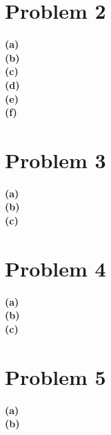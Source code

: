 \documentclass[fleqn]{article}
\begin{document}
\begin{adjustwidth}{-2cm}{-2cm}
\section{Problem 2}
\textbf{(a)}\\
\textbf{(b)}\\
\textbf{(c)}\\
\textbf{(d)}\\
\textbf{(e)}\\
\textbf{(f)}\\

\section{Problem 3}
\textbf{(a)}\\
\textbf{(b)}\\
\textbf{(c)}\\

\section{Problem 4}
\textbf{(a)}\\
\textbf{(b)}\\
\textbf{(c)}\\

\section{Problem 5}
\textbf{(a)}\\
\textbf{(b)}\\

\end{adjustwidth}
\end{document}
